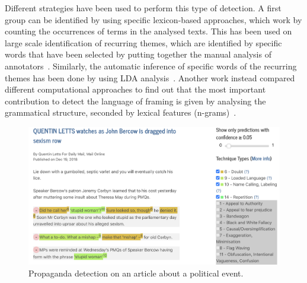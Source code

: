 Different strategies have been used to perform this type of detection.
A first group can be identified by using specific lexicon-based approaches, which work by counting the occurrences of terms in the analysed texts.
This has been used on large scale identification of recurring themes, which are identified by specific words that have been selected by putting together the manual analysis of annotators~\cite{field2018framing}.
Similarly, the automatic inference of specific words of the recurring themes has been done by using LDA analysis~\cite{tsur2015frame}.
Another work instead compared different computational approaches to find out that the most important contribution to detect the language of framing is given by analysing the grammatical structure, seconded by lexical features (n-grams)~\cite{baumer2015testing}.


\begin{figure}[!htb]
    \centering
    \includegraphics[width=\linewidth]{figures/brexit_propaganda.png}
    \caption{Propaganda detection on an article about a political event.}
    \label{fig:brexit_propaganda}
\end{figure}

